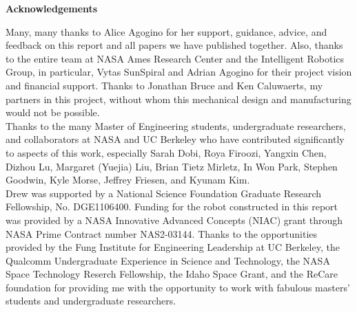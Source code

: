 \documentclass[12pt]{report}
\begin{document}

\begin{center}
\begin{minipage}{0.75\linewidth}
\vspace{4cm}
{\centering \textbf{Acknowledgements} \\[2cm] \par}
Many, many thanks to Alice Agogino for her support, guidance, advice, and feedback on this report and all papers we have published together.
Also, thanks to the entire team at NASA Ames Research Center and the Intelligent Robotics Group, in particular, Vytas SunSpiral and Adrian Agogino for their project vision and financial support.
Thanks to Jonathan Bruce and Ken Caluwaerts, my partners in this project, without whom this mechanical design and manufacturing would not be possible.\\

Thanks to the many Master of Engineering students, undergraduate researchers, and collaborators at NASA and UC Berkeley who have contributed significantly to aspects of this work, especially Sarah Dobi, Roya Firoozi, Yangxin Chen, Dizhou Lu, Margaret (Yuejia) Liu, Brian Tietz Mirletz, In Won Park, Stephen Goodwin, Kyle Morse, Jeffrey Friesen, and Kyunam Kim. \\

Drew was supported by a National Science Foundation Graduate Research Fellowship, No. DGE1106400. Funding for the robot constructed in this report was provided by a NASA Innovative Advanced Concepts (NIAC) grant through NASA Prime Contract number NAS2-03144.
Thanks to the opportunities provided by the Fung Institute for Engineering Leadership at UC Berkeley, the Qualcomm Undergraduate Experience in Science and Technology, the NASA Space Technology Reserch Fellowship, the Idaho Space Grant, and the ReCare foundation for providing me with the opportunity to work with fabulous masters' students and undergraduate researchers.
\end{minipage}
\end{center}
\clearpage

\tableofcontents
\listoffigures
\listoftables
\clearpage



\end{document}
